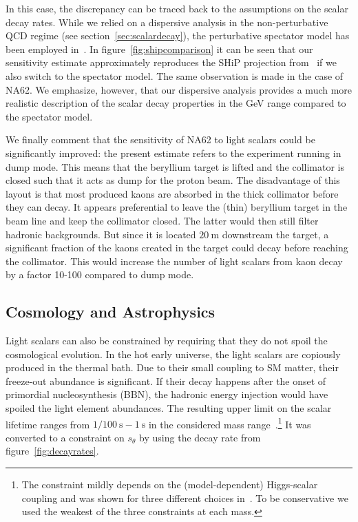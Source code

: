 \documentclass[preprintnumbers,twocolumn,aps,floats,nofootinbib]{revtex4-1}
\newcommand{\s}{\:\text{s}}
\begin{document}
In this case, the discrepancy can be traced back to the assumptions on the scalar decay rates. While we relied on a dispersive analysis in the non-perturbative QCD regime (see section~\ref{sec:scalardecay}), the perturbative spectator model has been employed in~\cite{Lanfranchi:2017,Lanfranchi:2017wzl}. In figure~\ref{fig:shipcomparison} it can be seen that our sensitivity estimate approximately reproduces the SHiP projection from~\cite{Lanfranchi:2017} if we also switch to the spectator model. The same observation is made in the case of NA62. We emphasize, however, that our dispersive analysis provides a much more realistic description of the scalar decay properties in the GeV range compared to the spectator model.

We finally comment that the sensitivity of NA62 to light scalars could be significantly improved: the present estimate refers to the experiment running in dump mode. This means that the beryllium target is lifted and the collimator is closed such that it acts as dump for the proton beam. The disadvantage of this layout is that most produced kaons are absorbed in the thick collimator before they can decay. It appears preferential to leave the (thin) beryllium target in the beam line and keep the collimator closed. The latter would then still filter hadronic backgrounds. But since it is located $20\:\text{m}$ downstream the target, a significant fraction of the kaons created in the target could decay before reaching the collimator. This would increase the number of light scalars from kaon decay by a factor 10-100 compared to dump mode.


\subsection{Cosmology and Astrophysics}
Light scalars can also be constrained by requiring that they do not spoil the cosmological evolution. In the hot early universe, the light scalars are copiously produced in the thermal bath. Due to their small coupling to SM matter, their freeze-out abundance is significant. If their decay happens after the onset of primordial nucleosynthesis (BBN), the hadronic energy injection would have spoiled the light element abundances. The resulting upper limit on the scalar lifetime ranges from $1/100\s-1\s$ in the considered mass range~\cite{Fradette:2017sdd}.\footnote{The constraint mildly depends on the (model-dependent) Higgs-scalar coupling and was shown for three different choices in~\cite{Fradette:2017sdd}. To be conservative we used the weakest of the three constraints at each mass.} 
It was converted to a constraint on $s_\theta$ by using the decay rate from figure~\ref{fig:decayrates}.
\end{document}
